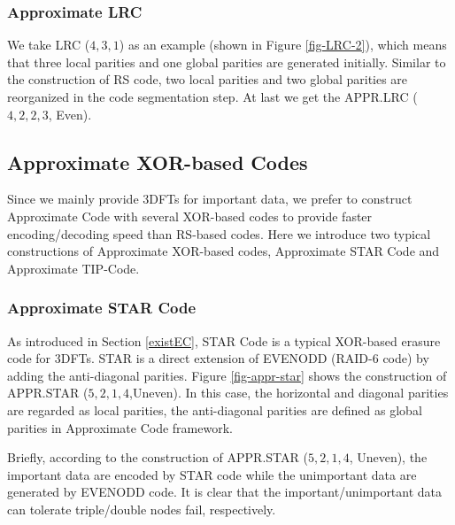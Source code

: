 \documentclass[sigconf]{acmart}
\begin{document}
\subsubsection{Approximate LRC}

We take LRC ($4, 3, 1$) \cite{LRC} as an example (shown in Figure \ref{fig-LRC-2}), which means that three local parities and one global parities are generated initially. Similar to the construction of RS code, two local parities and two global parities are reorganized in the code segmentation step. At last we get the APPR.LRC ($4, 2, 2, 3$, Even).

\subsection{Approximate XOR-based Codes}\label{APPRXOR}
Since we mainly provide 3DFTs for important data, we prefer to construct Approximate Code with several XOR-based codes to provide faster encoding/decoding speed than RS-based codes. Here we introduce two typical constructions of Approximate XOR-based codes, Approximate STAR Code and Approximate TIP-Code.

\subsubsection{Approximate STAR Code}

As introduced in Section \ref{existEC}, STAR Code \cite{STAR} is a typical XOR-based erasure code for 3DFTs. STAR is a direct extension of EVENODD\cite{EVENODD} (RAID-6 code) by adding the anti-diagonal parities. Figure \ref{fig-appr-star} shows the construction of APPR.STAR ($5,2,1,4$,Uneven). In this case, the horizontal and diagonal parities are regarded as local parities,  the anti-diagonal parities are defined as global parities in Approximate Code framework.

Briefly, according to the construction of APPR.STAR ($5,2,1,4$, Uneven), the important data are encoded by STAR code while the unimportant data are generated by EVENODD code. It is clear that the important/unimportant data can tolerate triple/double nodes fail, respectively.
\end{document}
